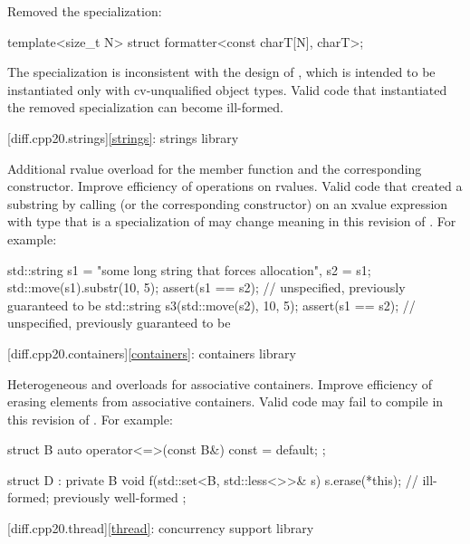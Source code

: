\change
Removed the  specialization:
\begin{codeblock}
template<size_t N> struct formatter<const charT[N], charT>;
\end{codeblock}
\rationale
The specialization is inconsistent with the design of ,
which is intended to be instantiated only with cv-unqualified object types.
\effect
Valid \CppXX{} code that instantiated the removed specialization
can become ill-formed.

[diff.cpp20.strings]{\ref{strings}: strings library}

\change
Additional rvalue overload for the  member function and
the corresponding constructor.
\rationale
Improve efficiency of operations on rvalues.
\effect
Valid \CppXX{} code that created a substring
by calling  (or the corresponding constructor)
on an xvalue expression with type 
that is a specialization of 
may change meaning in this revision of \Cpp{}.
For example:
\begin{codeblock}
std::string s1 = "some long string that forces allocation", s2 = s1;
std::move(s1).substr(10, 5);
assert(s1 == s2);       // unspecified, previously guaranteed to be 
std::string s3(std::move(s2), 10, 5);
assert(s1 == s2);       // unspecified, previously guaranteed to be 
\end{codeblock}

[diff.cpp20.containers]{\ref{containers}: containers library}

\change
Heterogeneous  and  overloads
for associative containers.
\rationale
Improve efficiency of erasing elements from associative containers.
\effect
Valid \CppXX{} code may fail to compile in this revision of \Cpp{}.
For example:
\begin{codeblock}
struct B {
  auto operator<=>(const B&) const = default;
};

struct D : private B {
  void f(std::set<B, std::less<>>& s) {
    s.erase(*this);             // ill-formed; previously well-formed
  }
};
\end{codeblock}

[diff.cpp20.thread]{\ref{thread}: concurrency support library}

